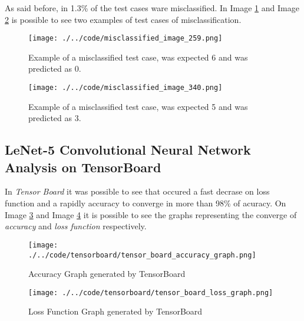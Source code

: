 \documentclass[journal]{IEEEtran}
\begin{document}


As said before, in 1.3\% of the test cases ware misclassified. In Image \ref{img:misclassification_one} and Image \ref{img:misclassification_two} is possible to see two examples of test cases of misclassification.

\begin{figure}
  \begin{center}
  \texttt{[image: ./../code/misclassified\_image\_259.png]}
  \caption{Example of a misclassified test case, was expected 6 and was predicted as 0.}
  \label{img:misclassification_one}
  \end{center}
\end{figure}

\begin{figure}
  \begin{center}
  \texttt{[image: ./../code/misclassified\_image\_340.png]}
  \caption{Example of a misclassified test case, was expected 5 and was predicted as 3.}
  \label{img:misclassification_two}
  \end{center}
\end{figure}

\subsection{LeNet-5 Convolutional Neural Network Analysis on TensorBoard}

In \textit{Tensor Board} it was possible to see that occured a fast decrase on loss function and a rapidly accuracy to converge in more than 98\% of acuracy. On Image \ref{img:accuracy} and Image \ref{img:loss_func} it is possible to see the graphs representing the converge of \textit{accuracy} and \textit{loss function} respectively.

\begin{figure}
  \begin{center}
  \texttt{[image: ./../code/tensorboard/tensor\_board\_accuracy\_graph.png]}
  \caption{Accuracy Graph generated by TensorBoard}
  \label{img:accuracy}
  \end{center}
\end{figure}

\begin{figure}
  \begin{center}
  \texttt{[image: ./../code/tensorboard/tensor\_board\_loss\_graph.png]}
  \caption{Loss Function Graph generated by TensorBoard}
  \label{img:loss_func}
  \end{center}
\end{figure}
\end{document}
